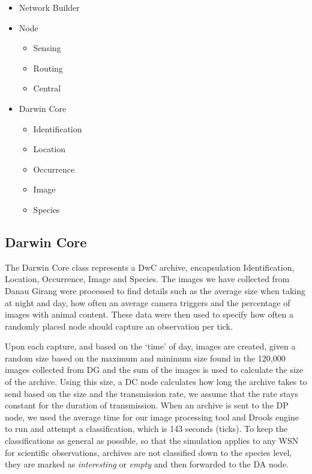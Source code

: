 \begin{itemize}
\item Network Builder
\item Node
	\begin{itemize}
	\item Sensing
	\item Routing
	\item Central
	\end{itemize}
\item Darwin Core
	\begin{itemize}
	\item Identification
	\item Location
	\item Occurrence
	\item Image
	\item Species
	\end{itemize}	 
\end{itemize}

\subsection{Darwin Core}
The Darwin Core class represents a DwC archive, encapsulation Identification, Location, Occurrence, Image and Species. The images we have collected from Danau Girang were processed to find details such as the average size when taking at night and day, how often an average camera triggers and the percentage of images with animal content. These data were then used to specify how often a randomly placed node should capture an observation per tick.

Upon each capture, and based on the `time' of day, images are created, given a random size based on the maximum and minimum size found in the 120,000 images collected from DG and the sum of the images is used to calculate the size of the archive. Using this size, a DC node calculates how long the archive takes to send based on the size and the transmission rate, we assume that the rate stays constant for the duration of transmission.
When an archive is sent to the DP node, we used the average time for our image processing tool and Drools engine to run and attempt a classification, which is 143 seconds (ticks). To keep the classifications as general as possible, so that the simulation applies to any WSN for scientific observations, archives are not classified down to the species level, they are marked as \textit{interesting} or \textit{empty} and then forwarded to the DA node.

